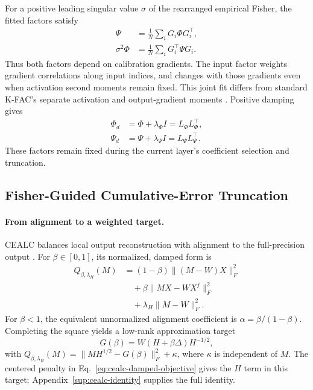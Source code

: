 \documentclass[11pt]{article}
\begin{document}
For a positive leading singular value $\sigma$ of the rearranged empirical Fisher, the fitted factors satisfy
\begin{equation}
\begin{aligned}
\Psi&=\frac1N\sum_iG_i\Phi G_i^\top,\\
\sigma^2\Phi&=\frac1N\sum_iG_i^\top\Psi G_i.
\end{aligned}
\label{eq:fisher-factor-coupling}
\end{equation}
Thus both factors depend on calibration gradients. The input factor weights gradient correlations along input indices, and changes with those gradients even when activation second moments remain fixed. This joint fit differs from standard K-FAC's separate activation and output-gradient moments \citep{grosse2016kfac}. Positive damping gives
\begin{equation}
\begin{aligned}
\Phi_d&=\Phi+\lambda_\Phi I=L_\Phi L_\Phi^\top,\\
\Psi_d&=\Psi+\lambda_\Psi I=L_\Psi L_\Psi^\top.
\end{aligned}
\label{eq:fisher-cholesky}
\end{equation}
These factors remain fixed during the current layer's coefficient selection and truncation.

\subsection{Fisher-Guided Cumulative-Error Truncation}\label{sec:fisher-cealc}

\paragraph{From alignment to a weighted target.}
CEALC balances local output reconstruction with alignment to the full-precision output \citep{hu2026saessvd}. For $\beta\in[0,1]$, its normalized, damped form is
\begin{equation}
\begin{aligned}
Q_{\beta,\lambda_H}(M)
&=(1-\beta)\|(M-W)X\|_F^2\\
&\quad+\beta\|MX-WX^f\|_F^2\\
&\quad+\lambda_H\|M-W\|_F^2.
\end{aligned}
\label{eq:cealc-damped-objective}
\end{equation}
For $\beta<1$, the equivalent unnormalized alignment coefficient is $\alpha=\beta/(1-\beta)$. Completing the square yields a low-rank approximation target
\begin{equation}
G(\beta)=W(H+\beta\Delta)H^{-1/2},
\label{eq:cealc-target}
\end{equation}
with $Q_{\beta,\lambda_H}(M)=\|MH^{1/2}-G(\beta)\|_F^2+\kappa$, where $\kappa$ is independent of $M$. The centered penalty in Eq.~\eqref{eq:cealc-damped-objective} gives the $H$ term in this target; Appendix~\ref{sup:cealc-identity} supplies the full identity.
\end{document}
